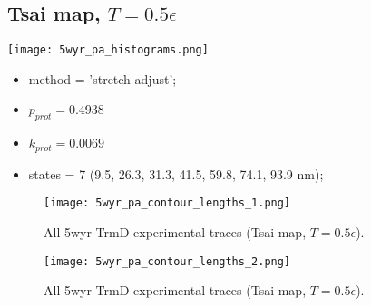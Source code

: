 \subsection{Tsai map, $T=0.5\epsilon$}
\label{subsec:5wyr-pa}
\begin{minipage}[c]{0.7\textwidth}
    \texttt{[image: 5wyr\_pa\_histograms.png]}
\end{minipage}
\hfill
\begin{minipage}[c]{0.45\textwidth}
    \begin{itemize}
        \item method = 'stretch-adjust';
        \item $p_{prot}=0.4938$
        \item $k_{prot}=0.0069$
        \item states = 7 (9.5, 26.3, 31.3, 41.5, 59.8, 74.1, 93.9 nm);
    \end{itemize}
\end{minipage}

\begin{figure}
    \centering
    \texttt{[image: 5wyr\_pa\_contour\_lengths\_1.png]}
    \caption{All 5wyr TrmD experimental traces (Tsai map, $T=0.5\epsilon$).}
    \label{fig:5wyr-pa-cl1}
\end{figure}

\begin{figure}
    \centering
    \texttt{[image: 5wyr\_pa\_contour\_lengths\_2.png]}
    \caption{All 5wyr TrmD experimental traces (Tsai map, $T=0.5\epsilon$).}
    \label{fig:5wyr-pa-cl2}
\end{figure}

